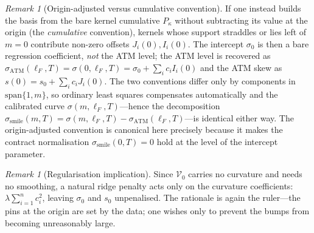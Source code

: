 \documentclass[11pt]{book}
\theoremstyle{plain}
\theoremstyle{definition}
\theoremstyle{remark}
\newtheorem{remark}[theorem]{Remark}
\newcommand{\mln}{m}                             %
\newcommand{\lF}{\ell_F}                         %
\newcommand{\ssm}{\sigma_{\mathrm{smile}}}       %
\newcommand{\satm}{\sigma_{\mathrm{ATM}}}        %
\begin{document}
\begin{remark}[Origin-adjusted versus cumulative convention]\label{rem:convention}
If one instead builds the basis from the bare kernel cumulative $P_\kappa$
without subtracting its value at the origin (the \emph{cumulative} convention),
kernels whose support straddles or lies left of $\mln=0$ contribute non-zero
offsets $J_i(0), I_i(0)$. The intercept $\sigma_0$ is then a bare regression
coefficient, \emph{not} the ATM level; the ATM level is recovered as
$\satm(\lF,T) = \sigma(0,\lF,T) = \sigma_0 + \sum_i c_i I_i(0)$ and the ATM skew
as $s(0) = s_0 + \sum_i c_i J_i(0)$. The two conventions differ only by
components in $\mathrm{span}\{1,\mln\}$, so ordinary least squares compensates
automatically and the calibrated curve $\sigma(\mln,\lF,T)$---hence the
decomposition $\ssm(\mln,T) = \sigma(\mln,\lF,T) - \satm(\lF,T)$---is identical
either way. The origin-adjusted convention is canonical here precisely
because it makes the contract normalisation $\ssm(0,T)=0$ hold at the level of
the intercept parameter.
\end{remark}

\begin{remark}[Regularisation implication]\label{rem:reg}
Since $\mathcal{V}_0$ carries no curvature and needs no smoothing, a natural
ridge penalty acts only on the curvature coefficients:
$\lambda \sum_{i=1}^n c_i^2$, leaving $\sigma_0$ and $s_0$ unpenalised. The
rationale is again the ruler---the pins at the origin are set by the data; one
wishes only to prevent the bumps from becoming unreasonably large.
\end{remark}
\end{document}
